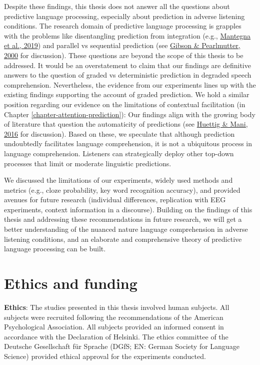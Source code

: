 \documentclass[a4paper, nobind]{templates/ociamthesis}
\begin{document}
Despite these findings, this thesis does not answer all the questions about predictive language processing, especially about prediction in adverse listening conditions.
The research domain of predictive language processing is grapples with the problems like disentangling prediction from integration (e.g., \protect\hyperlink{ref-Mantegna2019}{Mantegna et al., 2019}) and
parallel vs sequential prediction (see \protect\hyperlink{ref-Gibson2000}{Gibson \& Pearlmutter, 2000} for discussion).
These questions are beyond the scope of this thesis to be addressed.
It would be an overstatement to claim that our findings are definitive answers to the question of graded vs deterministic prediction in degraded speech comprehension.
Nevertheless, the evidence from our experiments lines up with the existing findings supporting the account of graded prediction.
We hold a similar position regarding our evidence on the limitations of contextual facilitation (in Chapter \ref{chapter-attention-prediction}):
Our findings align with the growing body of literature that question the automaticity of predictions (see \protect\hyperlink{ref-Huettig2016}{Huettig \& Mani, 2016} for discussion).
Based on these, we speculate that although prediction undoubtedly facilitates language comprehension,
it is not a ubiquitous process in language comprehension.
Listeners can strategically deploy other top-down processes that limit or moderate linguistic predictions.

We discussed the limitations of our experiments, widely used methods and metrics (e.g., cloze probability, key word recognition accuracy),
and provided avenues for future research (individual differences, replication with EEG experiments, context information in a discourse).
Building on the findings of this thesis and addressing these recommendations in future research,
we will get a better understanding of the nuanced nature language comprehension in adverse listening conditions,
and an elaborate and comprehensive theory of predictive language processing can be built.

\hypertarget{chapter-ethics}{%
\chapter{Ethics and funding}\label{chapter-ethics}}

\noindent 

\textbf{Ethics}: The studies presented in this thesis involved human subjects.
All subjects were recruited following the recommendations of the American Psychological Association.
All subjects provided an informed consent in accordance with the Declaration of Helsinki.
The ethics committee of the Deutsche Gesellschaft für Sprache (DGfS; EN: German Society for Language Science) provided ethical approval for the experiments conducted.
\end{document}
